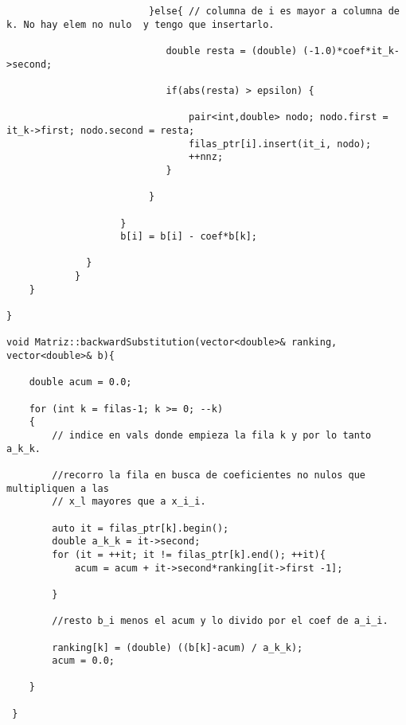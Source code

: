 \begin{lstlisting}
                         }else{ // columna de i es mayor a columna de k. No hay elem no nulo  y tengo que insertarlo.

                            double resta = (double) (-1.0)*coef*it_k->second;

                            if(abs(resta) > epsilon) {
                               
                                pair<int,double> nodo; nodo.first = it_k->first; nodo.second = resta;
                                filas_ptr[i].insert(it_i, nodo);
                                ++nnz;
                            }  

                         }
      
                    }
                    b[i] = b[i] - coef*b[k];

              }
            }  
    }

}

void Matriz::backwardSubstitution(vector<double>& ranking, vector<double>& b){

    double acum = 0.0;

    for (int k = filas-1; k >= 0; --k)
    {
        // indice en vals donde empieza la fila k y por lo tanto a_k_k.       

        //recorro la fila en busca de coeficientes no nulos que multipliquen a las
        // x_l mayores que a x_i_i.

        auto it = filas_ptr[k].begin();
        double a_k_k = it->second;
        for (it = ++it; it != filas_ptr[k].end(); ++it){
            acum = acum + it->second*ranking[it->first -1];

        }

        //resto b_i menos el acum y lo divido por el coef de a_i_i.

        ranking[k] = (double) ((b[k]-acum) / a_k_k);
        acum = 0.0;

    }

 }
 
\end{lstlisting}

\newpage